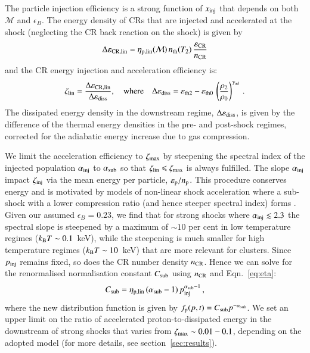 \documentclass[fleqn,usenatbib,useAMS]{mnras}
\newcommand{\eb}{\epsilon_B}
\newcommand{\p}{\rmn{p}}
\newcommand{\kB}{k_{\rmn{B}}}
\newcommand{\eps}{\varepsilon}
\newcommand{\CR}{\rmn{CR}}
\begin{document}
The particle injection efficiency is a strong function of
$x_{\mathrm{inj}}$ that depends on both $\mathcal{M}$ and $\eb$. The
energy density of CRs that are injected and accelerated at the shock
(neglecting the CR back reaction on the shock) is given by
\begin{equation}
\label{eq:CR_energy} 
  \Delta\eps_\rmn{CR,lin} =
  \eta_\rmn{p,lin}(\mathcal{M})\,n_\rmn{th}(T_2)
  \,\frac{\eps_\CR}{n_\CR}
\end{equation}
and the CR energy injection and acceleration efficiency is:
\begin{equation}
  \zeta_\rmn{lin} =
  \frac{\Delta\eps_\rmn{\CR,lin}}{\Delta\eps_\rmn{diss}},
   \quad\mbox{where}\quad
  \Delta\eps_\rmn{diss} = \eps_\rmn{th2} - \eps_\rmn{th0}\,\left(\frac{\rho_2}{\rho_0}\right)^{\gamma_\rmn{ad}}\,.
\label{eqn:energy_frac}  
\end{equation}
The dissipated energy density in the downstream regime,
$\Delta\eps_\rmn{diss}$, is given by the difference of the thermal
energy densities in the pre- and post-shock regimes, corrected for the
adiabatic energy increase due to gas compression.

We limit the acceleration efficiency to $\zeta_{\mathrm{max}}$ by
steepening the spectral index of the injected population
$\alpha_{\mathrm{inj}}$ to $\alpha_{\mathrm{sub}}$ so that $\zeta_{\mathrm{lin}}
\leqslant \zeta_{\mathrm{max}}$ is always fulfilled. The slope
$\alpha_{\mathrm{inj}}$ impact $\zeta_{\mathrm{inj}}$ via the mean energy per
particle, $\eps_\rmn{p}/n_\rmn{p}$. This
procedure conserves energy and is motivated by models of non-linear
shock acceleration where a sub-shock with a lower compression ratio
(and hence steeper spectral index) forms
\citep[e.g.,][]{2000ApJ...540..292E}. Given our assumed $\eb=0.23$, we
find that for strong shocks where $\alpha_{{\mathrm{inj}}} \lesssim 2.3$ the spectral
slope is steepened by a maximum of $\sim 10$ per cent in low
temperature regimes ($\kB T\sim 0.1$~keV), while the steepening is much
smaller for high temperature regimes ($\kB T\sim 10$~keV) that are more
relevant for clusters. Since $p_{\mathrm{inj}}$ remains fixed, so does the
CR number density $n_\CR$. Hence we can solve for the
renormalised normalisation constant $C_{\mathrm{sub}}$ using $n_\CR$
and Eqn.~\ref{eq:eta}:
\begin{equation}
  \label{eq:Cp_sub}
  C_{\mathrm{sub}}=\eta_{\mathrm{p,lin}}\,(\alpha_{\mathrm{sub}}-1)\,p_{\mathrm{inj}}^{\alpha_{\mathrm{sub}}-1}\,,
\end{equation}
where the new distribution function is given by $f_\p(p,t)= C_\rmn{sub}
p^{-\alpha_\rmn{sub}}$. We set an upper limit on the ratio of
accelerated proton-to-dissipated energy in the downstream of strong
shocks that varies from $\zeta_{\mathrm{max}} \sim 0.01-0.1$, depending on
the adopted model (for more details, see section~\ref{sec:results}).
\end{document}
